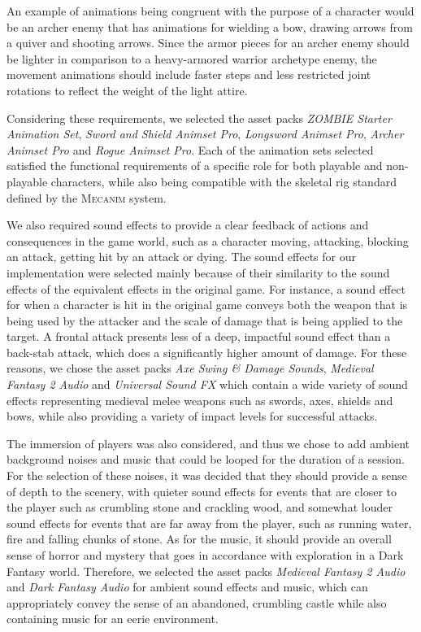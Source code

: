 An example of animations being congruent with the purpose of a character would be an archer enemy that has animations for wielding a bow, drawing arrows from a quiver and shooting arrows. Since the armor pieces for an archer enemy should be lighter in comparison to a heavy-armored warrior archetype enemy, the movement animations should include faster steps and less restricted joint rotations to reflect the weight of the light attire.

Considering these requirements, we selected the asset packs \emph{ZOMBIE Starter Animation Set}, \emph{Sword and Shield Animset Pro}, \emph{Longsword Animset Pro}, \emph{Archer Animset Pro} and \emph{Rogue Animset Pro}. Each of the animation sets selected satisfied the functional requirements of a specific role for both playable and non-playable characters, while also being compatible with the skeletal rig standard defined by the \textsc{Mecanim} system.

We also required sound effects to provide a clear feedback of actions and consequences in the game world, such as a character moving, attacking, blocking an attack, getting hit by an attack or dying. The sound effects for our implementation were selected mainly because of their similarity to the sound effects of the equivalent effects in the original game. For instance, a sound effect for when a character is hit in the original game conveys both the weapon that is being used by the attacker and the scale of damage that is being applied to the target. A frontal attack presents less of a deep, impactful sound effect than a back-stab attack, which does a significantly higher amount of damage. For these reasons, we chose the asset packs \emph{Axe Swing \& Damage Sounds}, \emph{Medieval Fantasy 2 Audio} and \emph{Universal Sound FX} which contain a wide variety of sound effects representing medieval melee weapons such as swords, axes, shields and bows, while also providing a variety of impact levels for successful attacks.

The immersion of players was also considered, and thus we chose to add ambient background noises and music that could be looped for the duration of a session. For the selection of these noises, it was decided that they should provide a sense of depth to the scenery, with quieter sound effects for events that are closer to the player such as crumbling stone and crackling wood, and somewhat louder sound effects for events that are far away from the player, such as running water, fire and falling chunks of stone. As for the music, it should provide an overall sense of horror and mystery that goes in accordance with exploration in a Dark Fantasy world. Therefore, we selected the asset packs \emph{Medieval Fantasy 2 Audio} and \emph{Dark Fantasy Audio} for ambient sound effects and music, which can appropriately convey the sense of an abandoned, crumbling castle while also containing music for an eerie environment.

